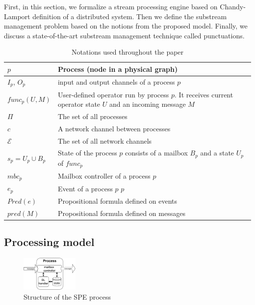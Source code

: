 \label{fs-acker-preliminaries}

First, in this section, we formalize a stream processing engine based on Chandy-Lamport definition of a distributed system. Then we define the substream management problem based on the notions from the proposed model. Finally, we discuss a state-of-the-art substream management technique called punctuations.

\begin{table}[!b]
    \caption{Notations used throughout the paper}
    \begin{tabular}{l|p{5cm}}
        \hline
        $p$ & Process (node in a physical graph) \\ 
        \hline
        $I_p$, $O_p$ & input and output channels of a process $p$ \\ 
        \hline
        $func_p(U, M)$ & User-defined operator run by process $p$. It receives current operator state $U$ and an incoming message $M$ \\ 
        \hline
        $\Pi$ & The set of all processes  \\
        \hline
        $c$ & A network channel between processes  \\
        \hline
        $\mathcal{E}$ & The set of all network channels  \\
        \hline
        $s_p = U_p \cup B_p$ & State of the process $p$ consists of a mailbox $B_p$ and a state $U_p$ of $func_p$ \\
        \hline
        $mbc_{p}$ & Mailbox controller of a process $p$ \\
        \hline
        $e_{p}$ & Event of a process $p$ $p$ \\
        \hline
        $Pred(e)$ & Propositional formula defined on events \\
        \hline
        $pred(M)$ & Propositional formula defined on messages\\
    \end{tabular}
    \label{notations}
\end{table}

\subsection{Processing model}

\begin{figure}[htbp]
  \centering
  \includegraphics[width=0.25\textwidth]{pics/process-scheme.pdf}
  \caption{Structure of the SPE process}
  \label{fig:spe_process}
\end{figure}

